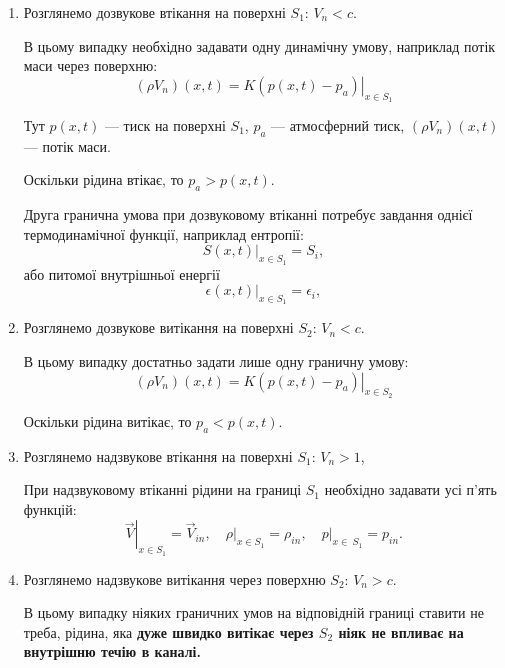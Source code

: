 \begin{enumerate}
	\item Розглянемо дозвукове втікання на поверхні $S_1$: $V_n < c$. \medskip   

	В цьому випадку необхідно задавати одну динамічну умову, наприклад потік маси через поверхню:
	\begin{equation}
		(\rho V_n )(x, t) = K \left. (p(x, t) - p_a) \right|_{x \in S_1}
	\end{equation}

	\begin{remark}
		Тут $p(x, t)$ --- тиск на поверхні $S_1$, $p_a$ --- атмосферний тиск, $(\rho V_n)(x, t)$ --- потік маси.
	\end{remark}

	\begin{remark}
		Оскільки рідина втікає, то $p_a > p(x, t)$.
	\end{remark}

	Друга гранична умова при дозвуковому втіканні потребує завдання однієї термодинамічної функції, наприклад ентропії:
	\begin{equation}
		\left. S(x, t) \right|_{x \in S_1} = S_i,
	\end{equation}
	або питомої внутрішньої енергії
	\begin{equation}
		\left. \epsilon(x, t) \right|_{x \in S_1} = \epsilon_i,
	\end{equation}

	\item Розглянемо дозвукове витікання на поверхні $S_2$: $V_n < c$. \medskip

	В цьому випадку достатньо задати лише одну граничну умову:
	\begin{equation}
		(\rho V_n )(x, t) = K \left. (p(x, t) - p_a) \right|_{x \in S_2}
	\end{equation}

	\begin{remark}
		Оскільки рідина витікає, то $p_a < p(x, t)$.
	\end{remark}

	\item Розглянемо надзвукове втікання на поверхні $S_1$: $V_n > 1$, \medskip

	При надзвуковому втіканні рідини на границі $S_1$ необхідно задавати усі п'ять функцій:
	\begin{equation}
		\left. \vec V \right|_{x \in S_1} = \vec V_{in}, \quad \left. \rho \right|_{x \in S_1} = \rho_{in}, \quad \left. p \right|_{x \in \ S_1} = p_{in}.
	\end{equation}

	\item Розглянемо надзвукове витікання через поверхню $S_2$: $V_n > c$. \medskip

	В цьому випадку ніяких граничних умов на відповідній границі ставити не треба, рідина, яка \bf{дуже швидко} витікає через $S_2$ ніяк не впливає на внутрішню течію в каналі.
\end{enumerate}